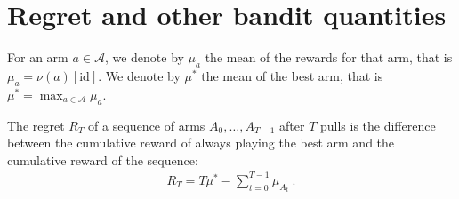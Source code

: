 









\section{Regret and other bandit quantities}

\begin{definition}\label{def:armMean}
  \leanok %
For an arm $a \in \mathcal{A}$, we denote by $\mu_a$ the mean of the rewards for that arm, that is $\mu_a = \nu(a)[\mathrm{id}]$.
We denote by $\mu^*$ the mean of the best arm, that is $\mu^* = \max_{a \in \mathcal{A}} \mu_a$.
\end{definition}


\begin{definition}[Regret]\label{def:regret}
  \leanok
The regret $R_T$ of a sequence of arms $A_0, \ldots, A_{T-1}$ after $T$ pulls is the difference between the cumulative reward of always playing the best arm and the cumulative reward of the sequence:
\begin{align*}
  R_T = T \mu^* - \sum_{t=0}^{T-1} \mu_{A_t} \: .
\end{align*}
\end{definition}

